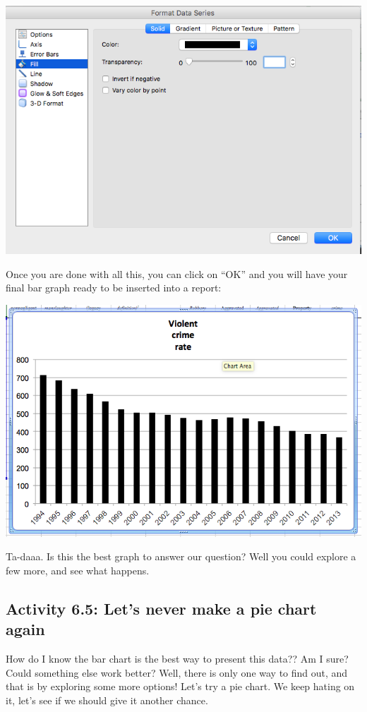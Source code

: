 \documentclass[
]{book}
\begin{document}
\includegraphics{imgs/desc_viz_13.png}

Once you are done with all this, you can click on ``OK'' and you will have your final bar graph ready to be inserted into a report:

\includegraphics{imgs/final_bar.png}

Ta-daaa. Is this the best graph to answer our question? Well you could explore a few more, and see what happens.

\hypertarget{activity-6.5-lets-never-make-a-pie-chart-again}{%
\subsection{Activity 6.5: Let's never make a pie chart again}\label{activity-6.5-lets-never-make-a-pie-chart-again}}

How do I know the bar chart is the best way to present this data?? Am I sure? Could something else work better? Well, there is only one way to find out, and that is by exploring some more options! Let's try a pie chart. We keep hating on it, let's see if we should give it another chance.
\end{document}

